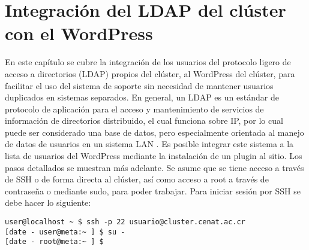 \chapter{Integración del LDAP del clúster con el WordPress}
En este capítulo se cubre la integración de los usuarios del protocolo ligero de acceso a directorios (LDAP) propios del clúster, al WordPress del clúster, para facilitar el uso del sistema de soporte sin necesidad de mantener usuarios duplicados en sistemas separados.
En general, un LDAP es un estándar de protocolo de aplicación para el acceso y mantenimiento de servicios de información de directorios distribuido, el cual funciona sobre IP, por lo cual puede ser  considerado una base de datos, pero especialmente orientada al manejo de datos de usuarios en un sistema LAN \cite{openldap}\cite{whatldap}.
Es posible integrar este sistema a la lista de usuarios del WordPress mediante la instalación de un plugin al sitio. Los pasos detallados se muestran más adelante. Se asume que se tiene acceso a través de SSH o de forma directa  al clúster, así como acceso a root a través de contraseña o mediante sudo, para poder trabajar. Para iniciar sesión por SSH se debe hacer lo siguiente:
\begin{lstlisting} 
user@localhost ~ $ ssh -p 22 usuario@cluster.cenat.ac.cr
[date - user@meta:~ ] $ su -
[date - root@meta:~ ] $ 
\end{lstlisting}

